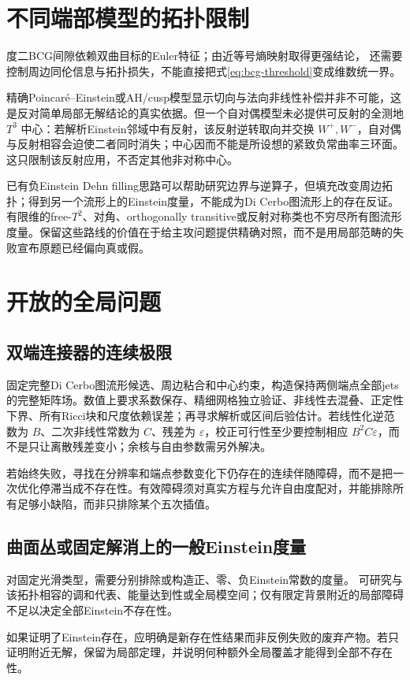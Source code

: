 \documentclass[UTF8,a4paper,11pt,fontset=fandol]{ctexart}
\numberwithin{equation}{section}
\theoremstyle{definition}
\begin{document}
\section{不同端部模型的拓扑限制}
度二BCG间隙依赖双曲目标的Euler特征；由近等号熵映射取得更强结论，
还需要控制周边同伦信息与拓扑损失，不能直接把式\eqref{eq:bcg-threshold}变成维数统一界。

精确Poincar\'e--Einstein或AH/cusp模型显示切向与法向非线性补偿并非不可能，这是反对简单局部无解结论的真实依据。但一个自对偶模型未必提供可反射的全测地 $T^3$ 中心：若解析Einstein邻域中有反射，该反射逆转取向并交换 $W^+,W^-$，自对偶与反射相容会迫使二者同时消失；中心因而不能是所设想的紧致负常曲率三环面。这只限制该反射应用，不否定其他非对称中心。

已有负Einstein Dehn filling思路可以帮助研究边界与逆算子，但填充改变周边拓扑；得到另一个流形上的Einstein度量，不能成为Di Cerbo图流形上的存在反证。有限维的free-$T^2$、对角、orthogonally transitive或反射对称类也不穷尽所有图流形度量。保留这些路线的价值在于给主攻问题提供精确对照，而不是用局部范畴的失败宣布原题已经偏向真或假。

\section{开放的全局问题}
\subsection{双端连接器的连续极限}
固定完整Di Cerbo图流形候选、周边粘合和中心约束，构造保持两侧端点全部jets的完整矩阵场。数值上要求系数保存、精细网格独立验证、非线性去混叠、正定性下界、所有Ricci块和尺度依赖误差；再寻求解析或区间后验估计。若线性化逆范数为 $B$、二次非线性常数为 $C$、残差为 $\varepsilon$，校正可行性至少要控制相应 $B^2C\varepsilon$，而不是只让离散残差变小；余核与自由参数需另外解决。

若始终失败，寻找在分辨率和端点参数变化下仍存在的连续伴随障碍，而不是把一次优化停滞当成不存在性。有效障碍须对真实方程与允许自由度配对，并能排除所有足够小缺陷，而非只排除某个五次插值。

\subsection{曲面丛或固定解消上的一般Einstein度量}
对固定光滑类型，需要分别排除或构造正、零、负Einstein常数的度量。
可研究与该拓扑相容的调和代表、能量达到性或全局模空间；仅有限定背景附近的局部障碍
不足以决定全部Einstein不存在性。

如果证明了Einstein存在，应明确是新存在性结果而非反例失败的废弃产物。若只证明附近无解，保留为局部定理，并说明何种额外全局覆盖才能得到全部不存在性。
\end{document}

